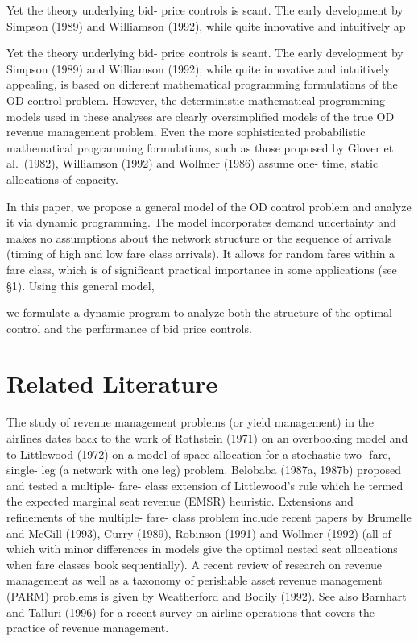 Yet the theory underlying bid- price controls is scant. The early
development by Simpson (1989) and Williamson (1992), while quite
innovative and intuitively ap

Yet the theory underlying bid- price controls is scant. The early
development by Simpson (1989) and Williamson (1992), while quite
innovative and intuitively appealing, is based on different mathematical
programming formulations of the OD control problem. However, the
deterministic mathematical programming models used in these analyses are
clearly oversimplified models of the true OD revenue management problem.
Even the more sophisticated probabilistic mathematical programming
formulations, such as those proposed by Glover et al.~(1982), Williamson
(1992) and Wollmer (1986) assume one- time, static allocations of
capacity.

In this paper, we propose a general model of the OD control problem and
analyze it via dynamic programming. The model incorporates demand
uncertainty and makes no assumptions about the network structure or the
sequence of arrivals (timing of high and low fare class arrivals). It
allows for random fares within a fare class, which is of significant
practical importance in some applications (see §1). Using this general
model,

we formulate a dynamic program to analyze both the structure of the
optimal control and the performance of bid price controls.

\section{Related Literature}\label{related-literature}

The study of revenue management problems (or yield management) in the
airlines dates back to the work of Rothstein (1971) on an overbooking
model and to Littlewood (1972) on a model of space allocation for a
stochastic two- fare, single- leg (a network with one leg) problem.
Belobaba (1987a, 1987b) proposed and tested a multiple- fare- class
extension of Littlewood's rule which he termed the expected marginal
seat revenue (EMSR) heuristic. Extensions and refinements of the
multiple- fare- class problem include recent papers by Brumelle and
McGill (1993), Curry (1989), Robinson (1991) and Wollmer (1992) (all of
which with minor differences in models give the optimal nested seat
allocations when fare classes book sequentially). A recent review of
research on revenue management as well as a taxonomy of perishable asset
revenue management (PARM) problems is given by Weatherford and Bodily
(1992). See also Barnhart and Talluri (1996) for a recent survey on
airline operations that covers the practice of revenue management.

